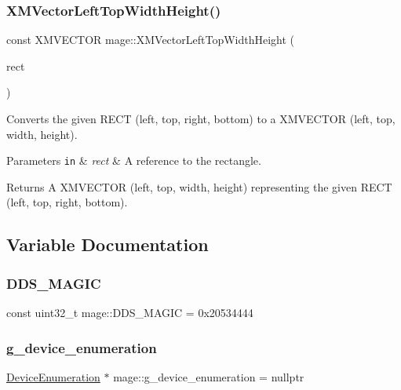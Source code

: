 \subsubsection{\texorpdfstring{X\+M\+Vector\+Left\+Top\+Width\+Height()}{XMVectorLeftTopWidthHeight()}}
{\footnotesize\ttfamily const X\+M\+V\+E\+C\+T\+OR mage\+::\+X\+M\+Vector\+Left\+Top\+Width\+Height (\begin{DoxyParamCaption}\item[{const R\+E\+CT \&}]{rect }\end{DoxyParamCaption})}

Converts the given {\ttfamily R\+E\+CT} (left, top, right, bottom) to a {\ttfamily X\+M\+V\+E\+C\+T\+OR} (left, top, width, height).


\begin{DoxyParams}[1]{Parameters}
\mbox{\tt in}  & {\em rect} & A reference to the rectangle. \\
\hline
\end{DoxyParams}
\begin{DoxyReturn}{Returns}
A {\ttfamily X\+M\+V\+E\+C\+T\+OR} (left, top, width, height) representing the given {\ttfamily R\+E\+CT} (left, top, right, bottom). 
\end{DoxyReturn}


\subsection{Variable Documentation}
\hypertarget{namespacemage_a52f784e41b51fee843891c6b5e9be479}{}\label{namespacemage_a52f784e41b51fee843891c6b5e9be479} 
\subsubsection{\texorpdfstring{D\+D\+S\+\_\+\+M\+A\+G\+IC}{DDS\_MAGIC}}
{\footnotesize\ttfamily const uint32\+\_\+t mage\+::\+D\+D\+S\+\_\+\+M\+A\+G\+IC = 0x20534444}

\hypertarget{namespacemage_a73e54b9b368875ed0281ced59e2fca7e}{}\label{namespacemage_a73e54b9b368875ed0281ced59e2fca7e} 
\subsubsection{\texorpdfstring{g\+\_\+device\+\_\+enumeration}{g\_device\_enumeration}}
{\footnotesize\ttfamily \hyperlink{classmage_1_1_device_enumeration}{Device\+Enumeration} $\ast$ mage\+::g\+\_\+device\+\_\+enumeration = nullptr}

